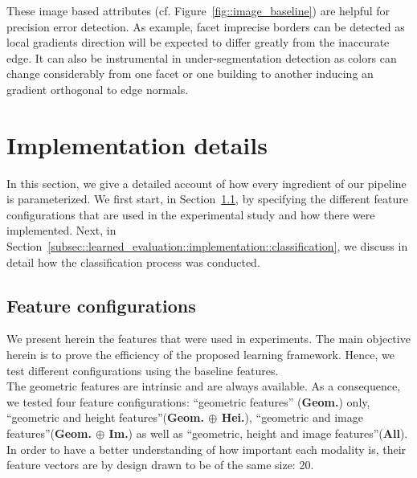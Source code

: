         These image based attributes (cf. Figure~\ref{fig::image_baseline}) are helpful for precision error detection.
        As example, facet imprecise borders can be detected as local gradients direction will be expected to differ greatly from the inaccurate edge.
        It can also be instrumental in under-segmentation detection as colors can change considerably from one facet or one building to another inducing an gradient orthogonal to edge normals.

\section{Implementation details}
    \label{sec::learned_evaluation::implementation}
    In this section, we give a detailed account of how every ingredient of our pipeline is parameterized.
    We first start, in Section~\ref{subsec::learned_evaluation::implementation::feature_configurations}, by specifying the different feature configurations that are used in the experimental study and how there were implemented.
    Next, in Section~\ref{subsec::learned_evaluation::implementation::classification}, we discuss in detail how the classification process was conducted.

    \subsection{Feature configurations}
        \label{subsec::learned_evaluation::implementation::feature_configurations}
        We present herein the features that were used in experiments.
        The main objective herein is to prove the efficiency of the proposed learning framework.
        Hence, we test different configurations using the baseline features.\\

        The geometric features are intrinsic and are always available.
        As a consequence, we tested four feature configurations: ``geometric features'' (\textbf{Geom.}) only, ``geometric and height features''(\textbf{Geom. \(\oplus\) Hei.}), ``geometric and image features''(\textbf{Geom. \(\oplus\) Im.}) as well as ``geometric, height and image features''(\textbf{All}).
        In order to have a better understanding of how important each modality is, their feature vectors are by design drawn to be of the same size: 20.\\


